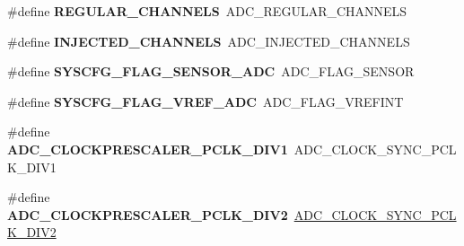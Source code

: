 \begin{DoxyCompactItemize}
\item 
\mbox{\label{group___h_a_l___a_d_c___aliased___defines_ga9480bc25f45fc189111dba13103c404e}} 
\#define {\bfseries R\+E\+G\+U\+L\+A\+R\+\_\+\+C\+H\+A\+N\+N\+E\+LS}~A\+D\+C\+\_\+\+R\+E\+G\+U\+L\+A\+R\+\_\+\+C\+H\+A\+N\+N\+E\+LS
\item 
\mbox{\label{group___h_a_l___a_d_c___aliased___defines_ga458eefd477e1e06e313716de162b7d0f}} 
\#define {\bfseries I\+N\+J\+E\+C\+T\+E\+D\+\_\+\+C\+H\+A\+N\+N\+E\+LS}~A\+D\+C\+\_\+\+I\+N\+J\+E\+C\+T\+E\+D\+\_\+\+C\+H\+A\+N\+N\+E\+LS
\item 
\mbox{\label{group___h_a_l___a_d_c___aliased___defines_ga48929ac8156ee0ea52c25ad3ec9fed11}} 
\#define {\bfseries S\+Y\+S\+C\+F\+G\+\_\+\+F\+L\+A\+G\+\_\+\+S\+E\+N\+S\+O\+R\+\_\+\+A\+DC}~A\+D\+C\+\_\+\+F\+L\+A\+G\+\_\+\+S\+E\+N\+S\+OR
\item 
\mbox{\label{group___h_a_l___a_d_c___aliased___defines_gaa7f5151463037ce60032a869f3e71665}} 
\#define {\bfseries S\+Y\+S\+C\+F\+G\+\_\+\+F\+L\+A\+G\+\_\+\+V\+R\+E\+F\+\_\+\+A\+DC}~A\+D\+C\+\_\+\+F\+L\+A\+G\+\_\+\+V\+R\+E\+F\+I\+NT
\item 
\mbox{\label{group___h_a_l___a_d_c___aliased___defines_gaaf80e00044e185957328f1d59bacdf37}} 
\#define {\bfseries A\+D\+C\+\_\+\+C\+L\+O\+C\+K\+P\+R\+E\+S\+C\+A\+L\+E\+R\+\_\+\+P\+C\+L\+K\+\_\+\+D\+I\+V1}~A\+D\+C\+\_\+\+C\+L\+O\+C\+K\+\_\+\+S\+Y\+N\+C\+\_\+\+P\+C\+L\+K\+\_\+\+D\+I\+V1
\item 
\mbox{\label{group___h_a_l___a_d_c___aliased___defines_ga058aa1143f9f7f123362039c9efcf4cb}} 
\#define {\bfseries A\+D\+C\+\_\+\+C\+L\+O\+C\+K\+P\+R\+E\+S\+C\+A\+L\+E\+R\+\_\+\+P\+C\+L\+K\+\_\+\+D\+I\+V2}~\hyperlink{group___a_d_c___clock_prescaler_ga71571b183aa6d0ddbaeef8a1da11d00a}{A\+D\+C\+\_\+\+C\+L\+O\+C\+K\+\_\+\+S\+Y\+N\+C\+\_\+\+P\+C\+L\+K\+\_\+\+D\+I\+V2}
\item 
\mbox{\label{group___h_a_l___a_d_c___aliased___defines_ga98bc3d5a9f7e069183a205c8458a6645}} 

\end{DoxyCompactItemize}
